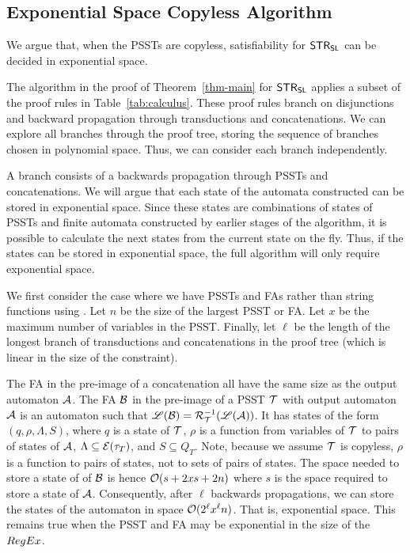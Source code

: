 
\subsection{Exponential Space Copyless Algorithm}
\label{sec:appendix}

We argue that, when the PSSTs are copyless, satisfiability for $\mathsf{STR}_{\mathsf{SL}}$ can be decided in exponential space.

The algorithm in the proof of Theorem~\ref{thm-main} for $\mathsf{STR}_{\mathsf{SL}}$ applies a subset of the proof rules in Table~\ref{tab:calculus}. These proof rules branch on disjunctions and backward propagation through transductions and concatenations. We can explore all branches through the proof tree, storing the sequence of branches chosen in polynomial space. Thus, we can consider each branch independently.

A branch consists of a backwards propagation through PSSTs and concatenations. We will argue that each state of the automata constructed can be stored in exponential space.
Since these states are combinations of states of PSSTs and finite automata constructed by earlier stages of the algorithm, it is possible to calculate the next states from the current state on the fly.
Thus, if the states can be stored in exponential space, the full algorithm will only require exponential space.

We first consider the case where we have PSSTs and FAs rather than string functions using \regexp{}.
Let $n$ be the size of the largest PSST or FA.
Let $x$ be the maximum number of variables in the PSST.
Finally, let $\ell$ be the length of the longest branch of transductions and concatenations in the proof tree (which is linear in the size of the constraint).

The FA in the pre-image of a concatenation all have the same size as the output automaton $\mathcal{A}$.
The FA $\mathcal{B}$ in the pre-image of a PSST $\mathcal{T}$ with output automaton $\mathcal{A}$ is an automaton such that
$\mathscr{L}(\mathcal{B}) = \mathcal{R}^{-1}_{\mathcal{T}}(\mathscr{L}(\mathcal{A}))$.
It has states of the form
$(q, \rho, \Lambda, S)$,
where
    $q$ is a state of $\mathcal{T}$,
    $\rho$ is a function from variables of $\mathcal{T}$ to pairs of states of $\mathcal{A}$,
    $\Lambda \subseteq \mathcal{E}(\tau_T)$, and
    $S \subseteq Q_T$.
Note, because we assume $\mathcal{T}$ is copyless, $\rho$ is a function to pairs of states, not to sets of pairs of states.
The space needed to store a state of of $\mathcal{B}$ is hence
$\mathcal{O}(s + 2 x s + 2 n)$
where $s$ is the space required to store a state of $\mathcal{A}$.
Consequently, after $\ell$ backwards propagations, we can store the states of the automaton in space
$\mathcal{O}(2^\ell x^\ell n)$.
That is, exponential space.
This remains true when the PSST and FA may be exponential in the size of the ${RegEx}$.





